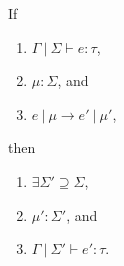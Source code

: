 \documentclass{llncs}
\begin{document}
\newpage

\begin{theorem}[Preservation]
If
\begin{enumerate}
\item $\Gamma~|~\Sigma \vdash e : \tau$,
\item $\mu : \Sigma$, and
\item $e~|~\mu \longrightarrow e'~|~\mu'$,
\end{enumerate}
then
\begin{enumerate}
\item $\exists \Sigma' \supseteq \Sigma$,
\item $\mu' : \Sigma'$, and
\item $\Gamma~|~\Sigma' \vdash e' : \tau$.
\end{enumerate}

\end{theorem}
\end{document}
